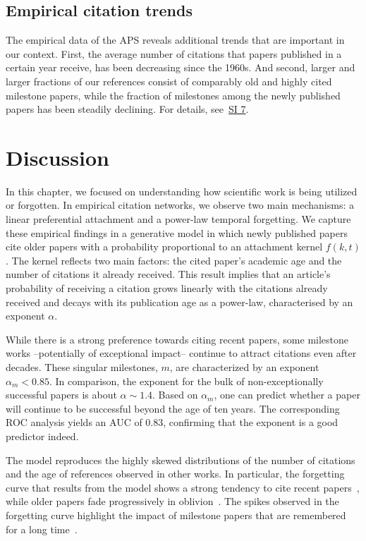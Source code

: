 \documentclass[draft,final]{vutinfth} %
\begin{document}
\subsection{Empirical citation trends}
The empirical data of the APS reveals additional trends that are important in our context. First, the average number of citations that papers published in a certain year receive, has been decreasing since the 1960s. And second, larger and larger fractions of our references consist of comparably old and highly cited milestone papers, while the fraction of milestones among the newly published papers has been steadily declining. For details, see~\hyperref[SI7]{SI 7}.

\section{Discussion}
In this chapter, we focused on understanding how scientific work is being utilized or forgotten. In empirical citation networks, we observe two main mechanisms: a linear preferential attachment and a power-law temporal forgetting. We capture these empirical findings in a generative model in which newly published papers cite older papers with a probability proportional to an attachment kernel $f(k, t)$. The kernel reflects two main factors: the cited paper's academic age and the number of citations it already received. This result implies that an article's probability of receiving a citation grows linearly with the citations already received and decays with its publication age as a power-law, characterised by an exponent $\alpha$.

While there is a strong preference towards citing recent papers, some milestone works --potentially of exceptional impact-- continue to attract citations even after decades. These singular milestones, $m$, are characterized by an exponent $\alpha_m < 0.85$. In comparison, the exponent for the bulk of non-exceptionally successful papers is about  $\alpha \sim 1.4 $. Based on $\alpha_m$, one can predict whether a paper will continue to be successful beyond the age of ten years. The corresponding ROC analysis yields an AUC of $0.83$, confirming that the exponent is a good predictor indeed. 

The model reproduces the highly skewed distributions of the number of citations and the age of references observed in other works. In particular, the forgetting curve that results from the model shows a strong tendency to cite recent papers~\cite{deSollaPrice1965, Burton1960}, while older papers fade progressively in oblivion~\cite{deSollaPrice1965, Redner2005, Burton1960}. The spikes observed in the forgetting curve highlight the impact of milestone papers that are remembered for a long time~\cite{Redner2005, Golosovsky2017}.
\end{document}
